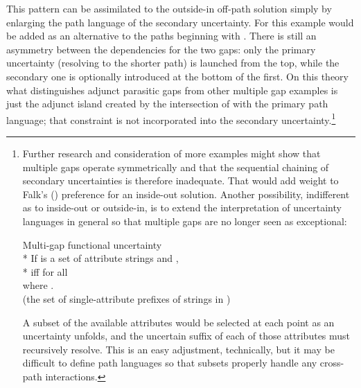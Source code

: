 \documentclass[output=paper,hidelinks]{langscibook}
\begin{document}
\largerpage
\noindent  This pattern can be assimilated to the  outside-in off-path solution simply by enlarging the path language of the secondary uncertainty.  For this example  would be added as an alternative to the paths beginning with \ADJ. There is still an asymmetry between the dependencies for the two gaps: only the primary uncertainty (resolving to the shorter path) is launched from the top, while the secondary one is optionally introduced at the bottom of the first. On this theory what distinguishes adjunct parasitic gaps from other multiple gap examples is just the adjunct island created by the intersection of  with the primary path language; that constraint is not incorporated into the secondary uncertainty.\footnote{Further research and consideration of more  examples might show that multiple gaps operate symmetrically and that the sequential chaining of secondary uncertainties is therefore inadequate.  That would add weight to Falk's (\citeyear{Falk11}) preference for an inside-out solution.  Another possibility, indifferent as to inside-out or outside-in, is to extend the interpretation of uncertainty languages in general so that multiple gaps are no longer seen as exceptional:

\ea\label{multifu}Multi-gap functional uncertainty\\*
   If  is a set of attribute strings and ,\\*
      \hsp{2em}  iff  for all \\
          \hsp{4em} where .\\
                             \hsp{6em} (the set of single-attribute prefixes of strings in )
\z

\noindent A subset  of the available attributes would be selected at each point as an uncertainty unfolds, and the uncertain suffix of each of those attributes must recursively resolve.  This is an easy adjustment, technically, but it may be difficult to define path languages so that  subsets properly handle any cross-path interactions.}


\end{document}
